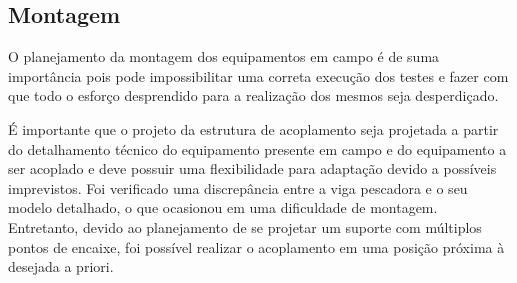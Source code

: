 \subsection{Montagem}

O planejamento da montagem dos equipamentos em campo é de suma importância pois
pode impossibilitar uma correta execução dos testes e fazer com que todo o
esforço desprendido para a realização dos mesmos seja desperdiçado.

É importante que o projeto da estrutura de acoplamento seja projetada a partir
do detalhamento técnico do equipamento presente em campo e do equipamento a ser
acoplado e deve possuir uma flexibilidade para adaptação devido a possíveis
imprevistos.
Foi verificado uma discrepância entre a viga pescadora e o seu modelo detalhado,
o que ocasionou em uma dificuldade de montagem. Entretanto, devido ao
planejamento de se projetar um suporte com múltiplos pontos de encaixe, foi possível realizar o acoplamento
em uma posição próxima à desejada a priori.
